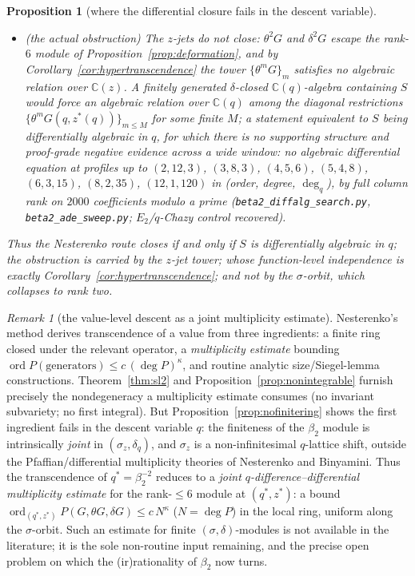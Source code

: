 \documentclass[11pt]{article}
\theoremstyle{plain}
\newtheorem{proposition}[theorem]{Proposition}
\theoremstyle{definition}
\theoremstyle{remark}
\newtheorem{remark}[theorem]{Remark}
\newcommand{\C}{\mathbb{C}}
\begin{document}
\begin{proposition}[where the differential closure fails in the descent variable]
\begin{itemize}
application of $\delta$ raises the $z$-jet order by two: $\delta^nS$ involves
$\theta^{2n}G|_{z=z^\ast}$ with unit leading coefficient.
\item[\textup{(iii)}] \textup{(the actual obstruction)} The $z$-jets do not close: $\theta^2G$ and
$\delta^2G$ escape the rank-$6$ module of Proposition~\ref{prop:deformation}, and by
Corollary~\ref{cor:hypertranscendence} the tower $\{\theta^mG\}_m$ satisfies no algebraic relation
over $\C(z)$. A finitely generated $\delta$-closed $\C(q)$-algebra containing $S$ would force an
algebraic relation over $\C(q)$ among the diagonal restrictions
$\{\theta^mG(q,z^\ast(q))\}_{m\le M}$ for some finite $M$; a statement equivalent to $S$ being
differentially algebraic in $q$, for which there is no supporting structure and proof-grade
negative evidence across a wide window: no algebraic differential equation at profiles up to
$(2,12,3)$, $(3,8,3)$, $(4,5,6)$, $(5,4,8)$, $(6,3,15)$, $(8,2,35)$, $(12,1,120)$ in
(order, degree, $\deg_q$), by full column rank on $2000$ coefficients modulo a prime
(\texttt{beta2\_diffalg\_search.py}, \texttt{beta2\_ade\_sweep.py}; $E_2$/$q$-Chazy control
recovered).
\end{itemize}
Thus the Nesterenko route closes \emph{if and only if} $S$ is differentially algebraic in $q$; the
obstruction is carried by the $z$-jet tower; whose function-level independence is exactly
Corollary~\ref{cor:hypertranscendence}; and not by the $\sigma$-orbit, which collapses to rank
two.
\end{proposition}

\begin{remark}[the value-level descent as a joint multiplicity estimate]
\label{rem:valuedescent}
Nesterenko's method derives transcendence of a value from three ingredients: a finite ring closed
under the relevant operator, a \emph{multiplicity estimate} bounding
$\operatorname{ord}P(\text{generators})\le c\,(\deg P)^\kappa$, and routine analytic size/Siegel-lemma
constructions. Theorem~\ref{thm:sl2} and Proposition~\ref{prop:nonintegrable} furnish precisely the
nondegeneracy a multiplicity estimate consumes (no invariant subvariety; no first integral). But
Proposition~\ref{prop:nofinitering} shows the first ingredient fails in the descent variable $q$: the
finiteness of the $\beta_2$ module is intrinsically \emph{joint} in $(\sigma_z,\delta_q)$, and
$\sigma_z$ is a non-infinitesimal $q$-lattice shift, outside the Pfaffian/differential multiplicity
theories of Nesterenko and Binyamini. Thus the transcendence of $q^\ast=\beta_2^{-2}$ reduces to a
\emph{joint $q$-difference--differential multiplicity estimate} for the rank-$\le6$ module at
$(q^\ast,z^\ast)$: a bound $\operatorname{ord}_{(q^\ast,z^\ast)}P(G,\theta G,\delta G)\le c\,N^\kappa$
($N=\deg P$) in the local ring, uniform along the $\sigma$-orbit. Such an estimate for finite
$(\sigma,\delta)$-modules is not available in the literature; it is the sole non-routine input
remaining, and the precise open problem on which the (ir)rationality of $\beta_2$ now turns.
\end{remark}
\end{document}
